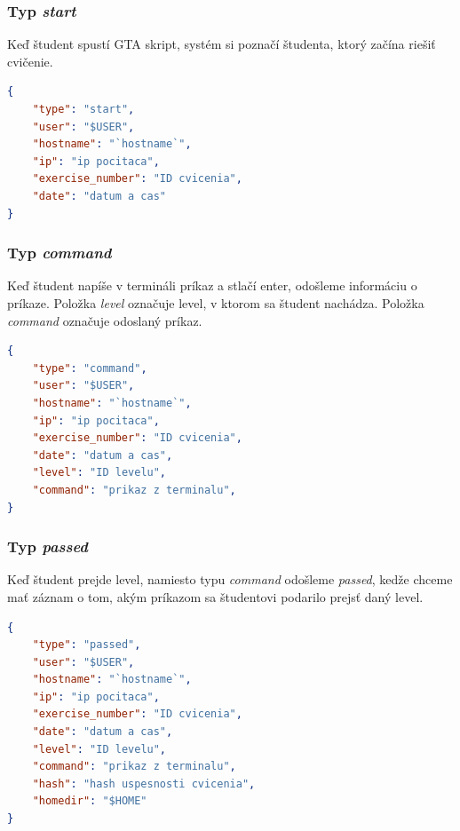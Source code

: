 \subsubsection{Typ \textit{start}}
\label{sec:zbieraniedat:start}

Keď študent spustí GTA skript, systém si poznačí študenta, ktorý začína riešiť cvičenie.

\begin{lstlisting}[language=json,firstnumber=1]
{
    "type": "start",
    "user": "$USER",
    "hostname": "`hostname`",
    "ip": "ip pocitaca",
    "exercise_number": "ID cvicenia",
    "date": "datum a cas"
}
\end{lstlisting}

\subsubsection{Typ \textit{command}}
\label{sec:zbieraniedat:gtadata:command}

Keď študent napíše v termináli príkaz a stlačí enter, odošleme informáciu o príkaze.
Položka \textit{level} označuje level, v ktorom sa študent nachádza. Položka
\textit{command} označuje odoslaný príkaz.

\begin{lstlisting}[language=json,firstnumber=1]
{
    "type": "command",
    "user": "$USER",
    "hostname": "`hostname`",
    "ip": "ip pocitaca",
    "exercise_number": "ID cvicenia",
    "date": "datum a cas",
    "level": "ID levelu",
    "command": "prikaz z terminalu",
}
\end{lstlisting}

\subsubsection{Typ \textit{passed}}
\label{sec:zbieraniedat:gtadata:passed}

Keď študent prejde level, namiesto typu \textit{command} odošleme \textit{passed},
kedže chceme mať záznam o tom, akým príkazom sa študentovi podarilo prejsť daný level.

\begin{lstlisting}[language=json,firstnumber=1]
{
    "type": "passed",
    "user": "$USER",
    "hostname": "`hostname`",
    "ip": "ip pocitaca",
    "exercise_number": "ID cvicenia",
    "date": "datum a cas",
    "level": "ID levelu",
    "command": "prikaz z terminalu",
    "hash": "hash uspesnosti cvicenia",
    "homedir": "$HOME"
}
\end{lstlisting}

